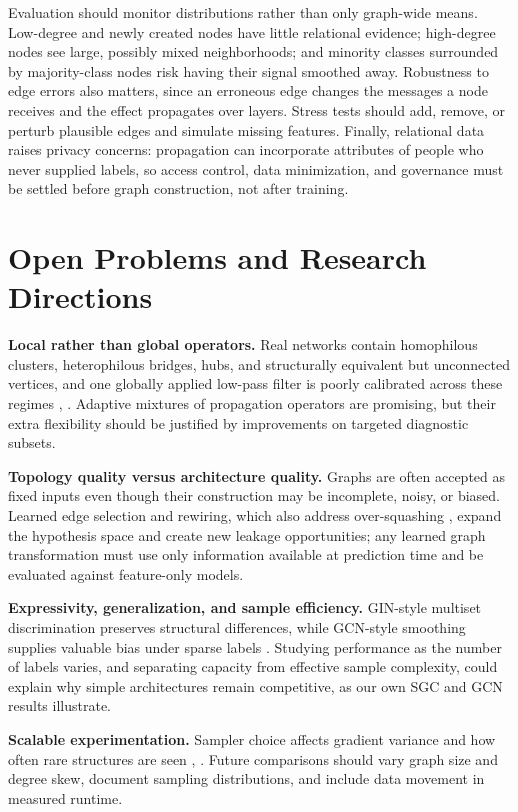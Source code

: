 \documentclass[conference]{IEEEtran}
\begin{document}
Evaluation should monitor distributions rather than only graph-wide means. Low-degree and newly created nodes have little relational evidence; high-degree nodes see large, possibly mixed neighborhoods; and minority classes surrounded by majority-class nodes risk having their signal smoothed away. Robustness to edge errors also matters, since an erroneous edge changes the messages a node receives and the effect propagates over layers. Stress tests should add, remove, or perturb plausible edges and simulate missing features. Finally, relational data raises privacy concerns: propagation can incorporate attributes of people who never supplied labels, so access control, data minimization, and governance must be settled before graph construction, not after training.

\section{Open Problems and Research Directions}

\textbf{Local rather than global operators.} Real networks contain homophilous clusters, heterophilous bridges, hubs, and structurally equivalent but unconnected vertices, and one globally applied low-pass filter is poorly calibrated across these regimes \cite{b10}, \cite{b14}. Adaptive mixtures of propagation operators are promising, but their extra flexibility should be justified by improvements on targeted diagnostic subsets.

\textbf{Topology quality versus architecture quality.} Graphs are often accepted as fixed inputs even though their construction may be incomplete, noisy, or biased. Learned edge selection and rewiring, which also address over-squashing \cite{b15}, expand the hypothesis space and create new leakage opportunities; any learned graph transformation must use only information available at prediction time and be evaluated against feature-only models.

\textbf{Expressivity, generalization, and sample efficiency.} GIN-style multiset discrimination \cite{b4} preserves structural differences, while GCN-style smoothing supplies valuable bias under sparse labels \cite{b1}. Studying performance as the number of labels varies, and separating capacity from effective sample complexity, could explain why simple architectures remain competitive, as our own SGC and GCN results illustrate.

\textbf{Scalable experimentation.} Sampler choice affects gradient variance and how often rare structures are seen \cite{b2}, \cite{b8}. Future comparisons should vary graph size and degree skew, document sampling distributions, and include data movement in measured runtime.
\end{document}
